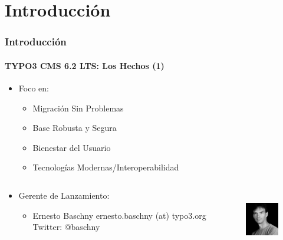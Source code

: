 \section{Introducción}
\begin{frame}[fragile]
	\frametitle{Introducción}
	\framesubtitle{TYPO3 CMS 6.2 LTS: Los Hechos (1)}

	\begin{itemize}
		\item Foco en:

			\begin{itemize}
				\item Migración Sin Problemas
				\item Base Robusta y Segura
				\item Bienestar del Usuario
				\item Tecnologías Modernas/Interoperabilidad
			\end{itemize}

	\end{itemize}

	\begin{columns}[T]

		\begin{column}{.5\textwidth}
			\begin{itemize}
				\item Gerente de Lanzamiento:
				\begin{itemize}
					\item Ernesto Baschny\newline
						ernesto.baschny (at) typo3.org\newline
						Twitter: @baschny
				\end{itemize}
			\end{itemize}
		\end{column}

		\begin{column}{.5\textwidth}
			\begin{figure}
				\includegraphics[width=2.6cm,height=2.6cm]{Images/Introduction/ErnestoBaschny.jpg}
			\end{figure}
		\end{column}

	\end{columns}

\end{frame}

